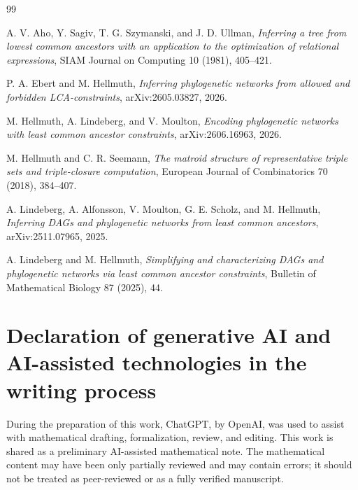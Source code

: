 \documentclass[11pt]{article}
\begin{document}
\begin{thebibliography}{99}
\small
\sloppy

A. V. Aho, Y. Sagiv, T. G. Szymanski, and J. D. Ullman,
\emph{Inferring a tree from lowest common ancestors with an application to the optimization of relational expressions},
SIAM Journal on Computing 10 (1981), 405--421.

P. A. Ebert and M. Hellmuth,
\emph{Inferring phylogenetic networks from allowed and forbidden LCA-constraints},
arXiv:2605.03827, 2026.

M. Hellmuth, A. Lindeberg, and V. Moulton,
\emph{Encoding phylogenetic networks with least common ancestor constraints},
arXiv:2606.16963, 2026.

M. Hellmuth and C. R. Seemann,
\emph{The matroid structure of representative triple sets and triple-closure computation},
European Journal of Combinatorics 70 (2018), 384--407.

A. Lindeberg, A. Alfonsson, V. Moulton, G. E. Scholz, and M. Hellmuth,
\emph{Inferring DAGs and phylogenetic networks from least common ancestors},
arXiv:2511.07965, 2025.

A. Lindeberg and M. Hellmuth,
\emph{Simplifying and characterizing DAGs and phylogenetic networks via least common ancestor constraints},
Bulletin of Mathematical Biology 87 (2025), 44.

\end{thebibliography}

\section*{Declaration of generative AI and AI-assisted technologies in the writing process}
During the preparation of this work, ChatGPT, by OpenAI, was used to assist with mathematical drafting, formalization, review, and editing. This work is shared as a preliminary AI-assisted mathematical note. The mathematical content may have been only partially reviewed and may contain errors; it should not be treated as peer-reviewed or as a fully verified manuscript.
\end{document}
